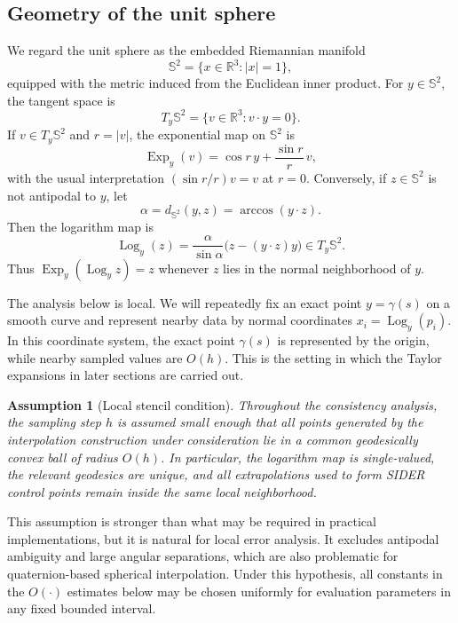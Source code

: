 \documentclass[a4paper,11pt]{article}
\newcommand{\bS}{\mathbb{S}}
\newcommand{\bR}{\mathbb{R}}
\newcommand{\Log}{\operatorname{Log}}
\newcommand{\Exp}{\operatorname{Exp}}
\newtheorem{assump}{Assumption}
\numberwithin{equation}{section}
\begin{document}
\subsection{Geometry of the unit sphere}

We regard the unit sphere as the embedded Riemannian manifold
\[
        \bS^2=\{x\in\bR^3: |x|=1\},
\]
equipped with the metric induced from the Euclidean inner product.  For
\(y\in\bS^2\), the tangent space is
\[
        T_y\bS^2=\{v\in\bR^3: v\cdot y=0\}.
\]
If \(v\in T_y\bS^2\) and \(r=|v|\), the exponential map on \(\bS^2\) is
\begin{equation}
\label{eq:exp_sphere}
        \Exp_y(v)
        =
        \cos r\, y+\frac{\sin r}{r}\,v ,
\end{equation}
with the usual interpretation \((\sin r/r)v=v\) at \(r=0\).  Conversely, if
\(z\in\bS^2\) is not antipodal to \(y\), let
\[
        \alpha=d_{\bS^2}(y,z)=\arccos(y\cdot z).
\]
Then the logarithm map is
\begin{equation}
\label{eq:log_sphere}
        \Log_y(z)
        =
        \frac{\alpha}{\sin\alpha}\bigl(z-(y\cdot z)y\bigr)
        \in T_y\bS^2 .
\end{equation}
Thus \(\Exp_y(\Log_y z)=z\) whenever \(z\) lies in the normal neighborhood of
\(y\).

The analysis below is local.  We will repeatedly fix an exact point
\(y=\gamma(s)\) on a smooth curve and represent nearby data by normal
coordinates \(x_i=\Log_y(p_i)\).  In this coordinate system, the exact point
\(\gamma(s)\) is represented by the origin, while nearby sampled values are
\(O(h)\).  This is the setting in which the Taylor expansions in later
sections are carried out.

\begin{assump}[Local stencil condition]
\label{assump:local_stencil}
Throughout the consistency analysis, the sampling step \(h\) is assumed small
enough that all points generated by the interpolation construction under
consideration lie in a common geodesically convex ball of radius \(O(h)\).
In particular, the logarithm map is single-valued, the relevant geodesics are
unique, and all extrapolations used to form SIDER control points remain inside
the same local neighborhood.
\end{assump}

This assumption is stronger than what may be required in practical
implementations, but it is natural for local error analysis.  It excludes
antipodal ambiguity and large angular separations, which are also problematic
for quaternion-based spherical interpolation.  Under this hypothesis, all
constants in the \(O(\cdot)\) estimates below may be chosen uniformly for
evaluation parameters in any fixed bounded interval.
\end{document}

